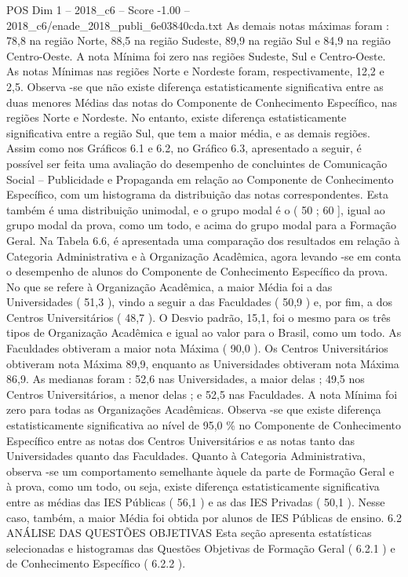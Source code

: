 \begin{textsample}{POS Dim 1 – 2018\_c6 – Score -1.00 – 2018\_c6/enade\_2018\_publi\_6e03840cda.txt}
As demais notas máximas foram : 78,8 na região Norte, 88,5 na região Sudeste, 89,9 na região Sul e 84,9 na região Centro-Oeste.
A nota Mínima foi zero nas regiões Sudeste, Sul e Centro-Oeste.
As notas Mínimas nas regiões Norte e Nordeste foram, respectivamente, 12,2 e 2,5.
Observa -se que não existe diferença estatisticamente significativa entre as duas menores Médias das notas do Componente de Conhecimento Específico, nas regiões Norte e Nordeste.
No entanto, existe diferença estatisticamente significativa entre a região Sul, que tem a maior média, e as demais regiões.
Assim como nos Gráficos 6.1 e 6.2, no Gráfico 6.3, apresentado a seguir, é possível ser feita uma avaliação do desempenho de concluintes de Comunicação Social – Publicidade e Propaganda em relação ao Componente de Conhecimento Específico, com um histograma da distribuição das notas correspondentes.
Esta também é uma distribuição unimodal, e o grupo modal é o ( 50 ; 60 ], igual ao grupo modal da prova, como um todo, e acima do grupo modal para a Formação Geral.
Na Tabela 6.6, é apresentada uma comparação dos resultados em relação à Categoria Administrativa e à Organização Acadêmica, agora levando -se em conta o desempenho de alunos do Componente de Conhecimento Específico da prova.
No que se refere à Organização Acadêmica, a maior Média foi a das Universidades ( 51,3 ), vindo a seguir a das Faculdades ( 50,9 ) e, por fim, a dos Centros Universitários ( 48,7 ).
O Desvio padrão, 15,1, foi o mesmo para os três tipos de Organização Acadêmica e igual ao valor para o Brasil, como um todo.
As Faculdades obtiveram a maior nota Máxima ( 90,0 ).
Os Centros Universitários obtiveram nota Máxima 89,9, enquanto as Universidades obtiveram nota Máxima 86,9.
As medianas foram : 52,6 nas Universidades, a maior delas ; 49,5 nos Centros Universitários, a menor delas ; e 52,5 nas Faculdades.
A nota Mínima foi zero para todas as Organizações Acadêmicas.
Observa -se que existe diferença estatisticamente significativa ao nível de 95,0 \% no Componente de Conhecimento Específico entre as notas dos Centros Universitários e as notas tanto das Universidades quanto das Faculdades.
Quanto à Categoria Administrativa, observa -se um comportamento semelhante àquele da parte de Formação Geral e à prova, como um todo, ou seja, existe diferença estatisticamente significativa entre as médias das IES Públicas ( 56,1 ) e as das IES Privadas ( 50,1 ).
Nesse caso, também, a maior Média foi obtida por alunos de IES Públicas de ensino. 6.2 ANÁLISE DAS QUESTÕES OBJETIVAS Esta seção apresenta estatísticas selecionadas e histogramas das Questões Objetivas de Formação Geral ( 6.2.1 ) e de Conhecimento Específico ( 6.2.2 ).

\end{textsample}
